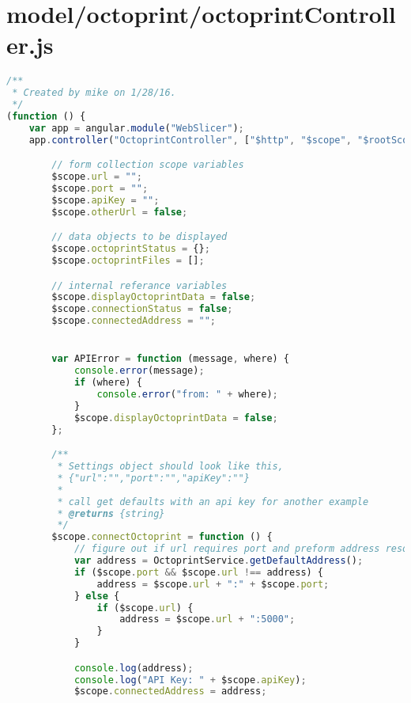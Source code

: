 
\section{model/octoprint/octoprintController.js}
\begin{lstlisting}[language=JavaScript, label={lst:octoprintController}, caption=The controller for the octoprint integration which was cut late in development.]
/**
 * Created by mike on 1/28/16.
 */
(function () {
    var app = angular.module("WebSlicer");
    app.controller("OctoprintController", ["$http", "$scope", "$rootScope", "OctoprintService", function ($http, $scope, $rootScope, OctoprintService) {

        // form collection scope variables
        $scope.url = "";
        $scope.port = "";
        $scope.apiKey = "";
        $scope.otherUrl = false;

        // data objects to be displayed
        $scope.octoprintStatus = {};
        $scope.octoprintFiles = [];

        // internal referance variables
        $scope.displayOctoprintData = false;
        $scope.connectionStatus = false;
        $scope.connectedAddress = "";


        var APIError = function (message, where) {
            console.error(message);
            if (where) {
                console.error("from: " + where);
            }
            $scope.displayOctoprintData = false;
        };

        /**
         * Settings object should look like this,
         * {"url":"","port":"","apiKey":""}
         *
         * call get defaults with an api key for another example
         * @returns {string}
         */
        $scope.connectOctoprint = function () {
            // figure out if url requires port and preform address resolution
            var address = OctoprintService.getDefaultAddress();
            if ($scope.port && $scope.url !== address) {
                address = $scope.url + ":" + $scope.port;
            } else {
                if ($scope.url) {
                    address = $scope.url + ":5000";
                }
            }

            console.log(address);
            console.log("API Key: " + $scope.apiKey);
            $scope.connectedAddress = address;



\end{lstlisting}
